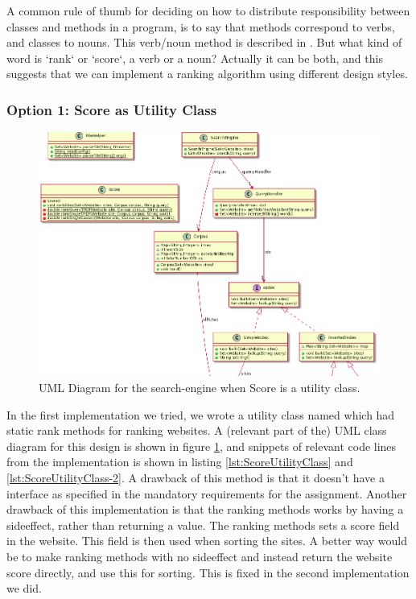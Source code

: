 A common rule of thumb for deciding on how to distribute responsibility between classes and methods in a program, is to say that methods correspond to verbs, and classes to nouns. This verb/noun method is described in \cite[p.530]{BK}.
But what kind of word is `rank` or `score`, a verb or a noun? Actually it can be both, and this suggests that we can implement a ranking algorithm using different design styles.

\subsubsection{Option 1: Score as Utility Class}
\begin{figure}[t]
	\centering
	\includegraphics[width=\textwidth]{graphics/uml/ScoreAsUtilityZoom.png}
	\caption{UML Diagram for the search-engine when Score is a utility class.}
	\label{fig:uml:ScoreAsUtility}
\end{figure}

In the first implementation we tried, we wrote a utility class named  which had static rank methods for ranking websites.   
A (relevant part of the) UML class diagram for this design is shown in figure \ref{fig:uml:ScoreAsUtility}, and snippets of relevant code lines from the implementation is shown in listing \ref{lst:ScoreUtilityClass} and \ref{lst:ScoreUtilityClass-2}. 
A drawback of this method is that it doesn't have a  interface as specified in the mandatory requirements for the assignment.
Another drawback of this implementation is that the ranking methods works by having a sideeffect, rather than returning a value. The ranking methods sets a score field in the website. This field is then used when sorting the sites. A better way would be to make ranking methods with no sideeffect and instead return the website score directly, and use this for sorting. This is fixed in the second implementation we did.      

